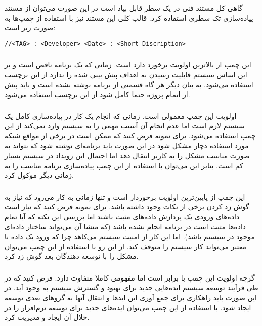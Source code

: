 گاهی کل مستند فنی در یک سطر قابل بیاد است در این صورت می‌توان از مستند پیاده‌سازی تک سطری استفاده کرد.
قالب کلی این مستند نیز با استفاده از چمپ‌ها به صورت زیر است:

\begin{latin}
\lstset{language=C++}
\begin{lstlisting}[frame=single] 
//<TAG> : <Developer> <Date> : <Short Discription>
\end{lstlisting}
\end{latin}


\subsubsection{}
این چمپ از بالاترین اولویت برخورد دارد است. زمانی که یک برنامه ناقص است و بر این اساس سیستم قابلیت
رسیدن به اهداف پیش بینی شده را ندارد از این برچسب استفاده می‌شود. به بیان دیگر هر گاه قسمتی از برنامه
نوشته نشده است و باید پیش از اتمام پروژه حتما کامل شود از این برچسب استفاده می‌شود.

\subsubsection{}
اولویت این چمپ معمولی است. زمانی که انجام یک کار در پیاده‌سازی کامل یک سیستم لازم است اما عدم انجام 
آن آسیب مهمی را به سیستم وارد نمی‌کند از این چمپ استفاده می‌شود. برای نمونه فرض کنید که ممکن است در
برخی از مواقع شبکه مورد استفاده دچار مشکل شود در این صورت باید برنامه‌ای نوشته شود که بتواند به صورت
مناسب مشکل را به کاربر انتقال دهد اما احتمال این رویداد در سیستم بسیار کم است. بنابر این می‌توان 
با استفاده از این چمپ پیاده‌سازی برنامه مناسب را به زمانی دیگر موکول کرد.

\subsubsection{}
این چمپ از پایین‌ترین اولویت برخوردار است و تنها زمانی به کار می‌رود که نیاز به گوش زد کردن برخی از 
نکات وجود داشته باشد. برای نمونه فرض کنید که نیاز است داده‌های ورودی یک پردازش داده‌های مثبت باشند
اما بررسی این نکته که آیا تمام داده‌ها مثبت است در برنامه انجام نشده باشد (که منشا آن می‌تواند ساختار
داده‌ای موجود در سیستم باشد). اما این کار از امنیت سیستم می‌کاهد چرا که ورود یک داده نا معتبر می‌تواند
کار سیستم را متوقف کند. از این رو با استفاده از این چمپ می‌توان مشکل را با توسعه دهندگان بعد گوش زد
کرد.

\subsubsection{}
گرچه اولویت این چمپ با  برابر است اما مفهومی کاملا متفاوت دارد. فرض کنید که در طی فرآیند 
توسعه سیستم ایده‌هایی جدید برای بهبود و گسترش سیستم به وجود آید. در این صورت باید راهکاری برای 
جمع آوری این ایدها و انتقال آنها به گروهای بعدی توسعه ایجاد شود. با استفاده از این چمپ می‌توان ایده‌های
جدید برای توسعه نرم‌افزار را در خلال آن ایجاد و مدیریت کرد.

